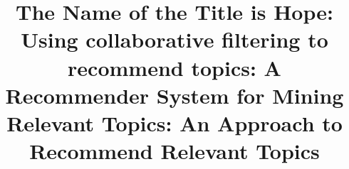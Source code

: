 \documentclass[sigconf,review, anonymous,screen]{acmart}
\begin{document}
\title{The Name of the Title is Hope}

\title{\CT: Using collaborative filtering to recommend \GH topics}

\title{\TF: A Recommender System for Mining Relevant \GH Topics}

\title{\TF: An Approach to Recommend Relevant \GH Topics}%







 
\end{document}

